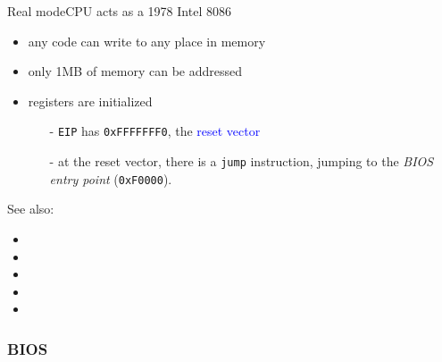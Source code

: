 \begin{frame}{Real mode}{CPU acts as a 1978 Intel 8086}
  \begin{varwidth}{.52\textwidth}
    \begin{itemize}
    \item any code can write to any place in memory
    \item only 1MB of memory can be addressed
    \item registers are initialized
      \begin{itemize}
      \item[-] \texttt{EIP} has \texttt{0xFFFFFFF0}, the \textcolor{blue}{reset vector}
      \item[-] at the reset vector, there is a \texttt{jump} instruction, jumping to the
        \emph{BIOS entry point} (\texttt{0xF0000}).%
      \end{itemize}
    \end{itemize}
  \end{varwidth}\hfill
  \begin{varwidth}{.48\textwidth}
    \begin{center}
    \end{center}
  \end{varwidth}
\end{frame}

See also:
\begin{itemize}
\item {}
\item {}
\item {}
\item {}
\item {}
\end{itemize}

\subsubsection{BIOS}

